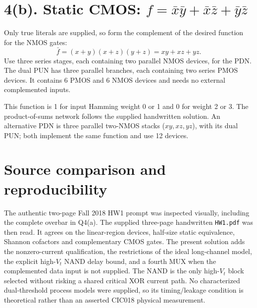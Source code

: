 \documentclass[11pt]{article}
\newcommand{\mos}[4]{\begin{scope}[shift={(#1,#2)}]
\draw (0,.24)--(0,-.24);
\draw (0,.20)--(.25,.20)--(.25,.5);
\draw (0,-.20)--(.25,-.20)--(.25,-.5);
\draw (-.16,.23)--(-.16,-.23);
\ifnum#4=1\draw (-.26,0) circle (.06);\draw (-.75,0)--(-.32,0);\else\draw (-.75,0)--(-.16,0);\fi
\node[anchor=east,font=\small] at (-.76,0) {$#3$};
\end{scope}}
\newcommand{\ground}[2]{\draw (#1,#2)--(#1,{#2-.12});\draw ({#1-.17},{#2-.12})--({#1+.17},{#2-.12});\draw ({#1-.11},{#2-.20})--({#1+.11},{#2-.20});}
\newcommand{\rail}[3]{\draw (#1,#2)--(#1,{#2+.15});\node[above,font=\small] at (#1,{#2+.15}) {$#3$};}
\newcommand{\outputnode}[3]{\fill (#1,#2) circle (.04);\draw (#1,#2)--({#1+.7},#2) node[right] {$#3$};}
\begin{document}
\section*{4(b). Static CMOS: $f=\bar{x}\bar{y}+\bar{x}\bar{z}+\bar{y}\bar{z}$}
Only true literals are supplied, so form the complement of the desired function for the NMOS gates:
\[
 \bar f=(x+y)(x+z)(y+z)=xy+xz+yz.
\]
Use three series stages, each containing two parallel NMOS devices, for the PDN. The dual PUN has three parallel branches, each containing two series PMOS devices. It contains 6 PMOS and 6 NMOS devices and needs no external complemented inputs.
\begin{center}\end{center}
This function is 1 for input Hamming weight 0 or 1 and 0 for weight 2 or 3. The product-of-sums network follows the supplied handwritten solution. An alternative PDN is three parallel two-NMOS stacks ($xy,xz,yz$), with its dual PUN; both implement the same function and use 12 devices.


\section*{Source comparison and reproducibility}
The authentic two-page Fall 2018 HW1 prompt was inspected visually, including
the complete overbar in Q4(a). The supplied three-page handwritten
\texttt{HW1.pdf} was then read. It agrees on the linear-region devices,
half-size static equivalence, Shannon cofactors and complementary CMOS gates.
The present solution adds the nonzero-current qualification, the restrictions
of the ideal long-channel model, the explicit high-$V_t$ NAND delay bound,
and a fourth MUX when the complemented data input is not supplied.
The NAND is the only high-$V_t$ block selected without risking a shared
critical XOR current path. No characterized dual-threshold process models
were supplied, so its timing/leakage condition is theoretical rather than
an asserted CIC018 physical measurement.
\end{document}
